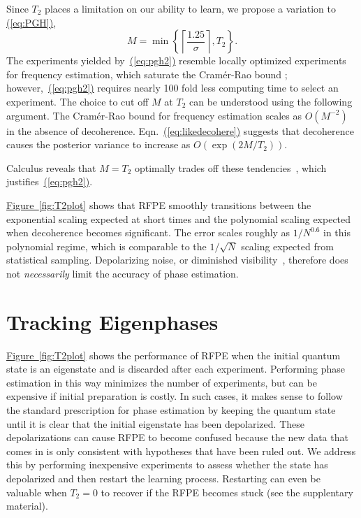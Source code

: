 \documentclass[aps,pra,amsmath,twocolumn,amssymb,superscriptaddress]{revtex4-1}
\newcommand{\eq}[1]{\hyperref[eq:#1]{(\ref*{eq:#1})}}
\newcommand{\app}[1]{the supplentary material}
\newcommand{\fig}[1]{\hyperref[fig:#1]{Figure~\ref*{fig:#1}}}
\begin{document}
Since $T_2$ places a limitation on our ability to learn, we propose a variation to \eq{PGH},
\begin{equation}
    \label{eq:pgh2}
    M = \min\left\{\left\lceil\frac{1.25}{\sigma}\right\rceil, T_2 \right\}.
\end{equation}
The experiments yielded by~\eq{pgh2} resemble locally optimized experiments for frequency estimation, which saturate the Cram\'er-Rao bound \cite{ferrie_how_2013}; however,~\eq{pgh2} requires nearly 100 fold less computing time to select an experiment.
The choice to cut off $M$ at $T_2$ can be understood using the following argument.  The Cram\'er-Rao bound for frequency estimation scales as $O(M^{-2})$~\cite{WGC15} in the absence of decoherence.  Eqn.~\eq{likedecohere} suggests that decoherence causes the posterior variance to increase as $O(\exp(2M/T_2))$. { Calculus reveals that $M=T_2$ optimally trades off these tendencies~\cite{ferrie_how_2013}, which justifies~\eq{pgh2}.

\fig{T2plot} shows that RFPE smoothly transitions between the exponential scaling expected at short times and the polynomial scaling expected when decoherence becomes significant.  The error scales roughly as $1/N^{0.6}$ in this polynomial regime, which is comparable to the $1/\sqrt{N}$ scaling expected from statistical sampling.  Depolarizing noise, or diminished visibility~\cite{hayes_swarm_2014}, therefore does not \emph{necessarily} limit the accuracy of phase estimation.



\section{Tracking Eigenphases}

\fig{T2plot} shows the performance of RFPE when the initial quantum state is an eigenstate and is discarded after each experiment.  Performing phase estimation in this way minimizes the number of experiments, but can be expensive if initial preparation is costly.  In such cases, it makes sense to follow the standard prescription for phase estimation by keeping the quantum state until it is clear that the initial eigenstate has been depolarized.  These depolarizations can cause RFPE to become confused because the new data that comes in is only consistent with hypotheses that have been ruled out.  We address this by performing inexpensive experiments to assess whether the state has depolarized and then restart the learning process. Restarting can even be valuable when $T_2=0$ to recover if the RFPE becomes stuck (see \app{var-reduction}).

}
\end{document}
